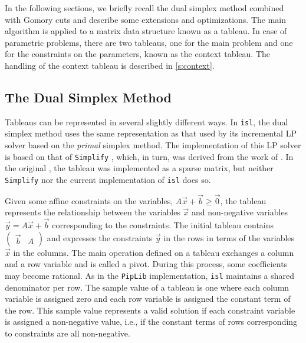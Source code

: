 In the following sections, we briefly recall the dual simplex
method combined with Gomory cuts and describe some extensions
and optimizations.  The main algorithm is applied to a matrix
data structure known as a tableau.  In case of parametric problems,
there are two tableaus, one for the main problem and one for
the constraints on the parameters, known as the context tableau.
The handling of the context tableau is described in \autoref{s:context}.

\subsection{The Dual Simplex Method}

Tableaus can be represented in several slightly different ways.
In {\tt isl}, the dual simplex method uses the same representation
as that used by its incremental LP solver based on the \emph{primal}
simplex method.  The implementation of this LP solver is based
on that of {\tt Simplify} , which, in turn,
was derived from the work of .
In the original , the tableau was implemented
as a sparse matrix, but neither {\tt Simplify} nor the current
implementation of {\tt isl} does so.

Given some affine constraints on the variables,
$A \vec x + \vec b \ge \vec 0$, the tableau represents the relationship
between the variables $\vec x$ and non-negative variables
$\vec y = A \vec x + \vec b$ corresponding to the constraints.
The initial tableau contains $\begin{pmatrix}
\vec b & A
\end{pmatrix}$ and expresses the constraints $\vec y$ in the rows in terms
of the variables $\vec x$ in the columns.  The main operation defined
on a tableau exchanges a column and a row variable and is called a pivot.
During this process, some coefficients may become rational.
As in the \texttt{PipLib} implementation,
{\tt isl} maintains a shared denominator per row.
The sample value of a tableau is one where each column variable is assigned
zero and each row variable is assigned the constant term of the row.
This sample value represents a valid solution if each constraint variable
is assigned a non-negative value, i.e., if the constant terms of
rows corresponding to constraints are all non-negative.

